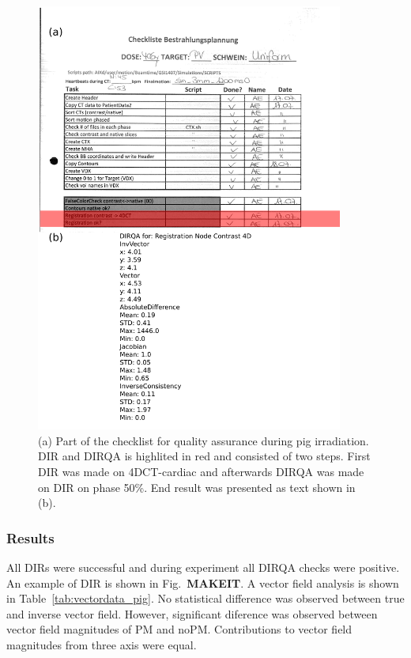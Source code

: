 \documentclass[type=dr, dr=rernat, accentcolor=tud7b,colorbacktitle, bigchapter, openright, twoside, 12pt ]{tudthesis}
\begin{document}
\newpage
\begin{figure}[H]
	\begin{center}		
		\includegraphics[width=0.9\textwidth]{./Images/checkList.png}
		\caption{(a) Part of the checklist for quality assurance during pig irradiation. DIR and DIRQA is highlited in red and consisted of two steps. First DIR was made on 4DCT-cardiac and afterwards DIRQA was made on
		DIR on phase 50\%. End result was presented as text shown in (b).}
		\label{checkList}
	\end{center}
\end{figure}
\newpage

\subsubsection{Results}


All DIRs were successful and during experiment all DIRQA checks were positive. An example of DIR is shown in Fig.~\textbf{MAKEIT}. A vector field analysis is shown in Table~\ref{tab:vectordata_pig}. No statistical difference was
observed between true and inverse vector field. However, significant diference was observed between vector field magnitudes of PM and noPM. Contributions to vector field magnitudes from three axis were equal. 
\end{document}

